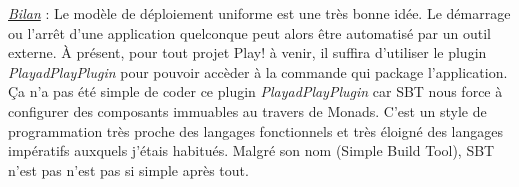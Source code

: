 \underline{\textit{Bilan}} : Le modèle de déploiement uniforme est une très
bonne idée. Le démarrage ou l'arrêt d'une application quelconque peut alors être
 automatisé par un outil externe. 
À présent, pour tout projet Play! à venir, il suffira d'utiliser le plugin
\textit{PlayadPlayPlugin} pour pouvoir accèder à la commande qui package
l'application.
Ça n'a pas été simple de coder ce plugin \textit{PlayadPlayPlugin} car SBT nous
force à configurer des composants immuables au travers de Monads. C'est un style
de programmation très proche des langages fonctionnels et très éloigné des
langages impératifs auxquels j'étais habitués. Malgré son nom (Simple Build
Tool), SBT n'est pas n'est pas si simple après tout.


